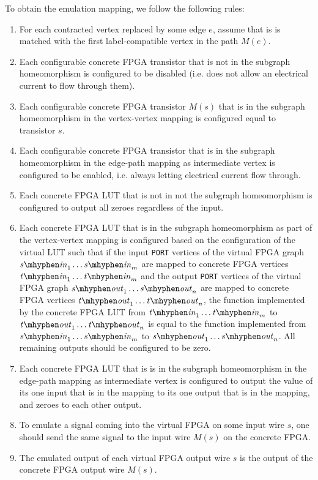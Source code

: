 To obtain the emulation mapping, we follow the following rules:
\begin{enumerate}
\item For each contracted vertex replaced by some edge $e$, assume that is is matched with the first label-compatible vertex in the path $M(e)$.
\item Each configurable concrete FPGA transistor that is not in the subgraph homeomorphism is configured to be disabled (i.e. does not allow an electrical current to flow through them).
\item Each configurable concrete FPGA transistor $M(s)$ that is in the subgraph homeomorphism in the vertex-vertex mapping is configured equal to transistor $s$.
\item Each configurable concrete FPGA transistor that is in the subgraph homeomorphism in the edge-path mapping as intermediate vertex is configured to be enabled, i.e. always letting electrical current flow through.
\item Each concrete FPGA LUT that is not in not the subgraph homeomorphism is configured to output all zeroes regardless of the input.
\item Each concrete FPGA LUT that is in the subgraph homeomorphism as part of the vertex-vertex mapping is configured based on the configuration of the virtual LUT such that if the input \texttt{PORT} vertices of the virtual FPGA graph $\mathit{s\mhyphen in}_1 \dots \mathit{s\mhyphen in}_m$ are mapped to concrete FPGA vertices $\mathit{t\mhyphen in}_1 \dots \mathit{t\mhyphen in}_m$ and the output \texttt{PORT} vertices of the virtual FPGA graph $\mathit{s\mhyphen out}_1 \dots \mathit{s\mhyphen out}_n$ are mapped to concrete FPGA vertices $\mathit{t\mhyphen out}_1 \dots \mathit{t\mhyphen out}_n$, the function implemented by the concrete FPGA LUT from $\mathit{t\mhyphen in}_1 \dots \mathit{t\mhyphen in}_m$ to $\mathit{t\mhyphen out}_1 \dots \mathit{t\mhyphen out}_n$ is equal to the function implemented from $\mathit{s\mhyphen in}_1 \dots \mathit{s\mhyphen in}_m$ to $\mathit{s\mhyphen out}_1 \dots \mathit{s\mhyphen out}_n$. All remaining outputs should be configured to be zero.
\item Each concrete FPGA LUT that is is in the subgraph homeomorphism in the edge-path mapping as intermediate vertex is configured to output the value of its one input that is in the mapping to its one output that is in the mapping, and zeroes to each other output.
\item To emulate a signal coming into the virtual FPGA on some input wire $s$, one should send the same signal to the input wire $M(s)$ on the concrete FPGA.
\item The emulated output of each virtual FPGA output wire $s$ is the output of the concrete FPGA output wire $M(s)$.
\end{enumerate}


